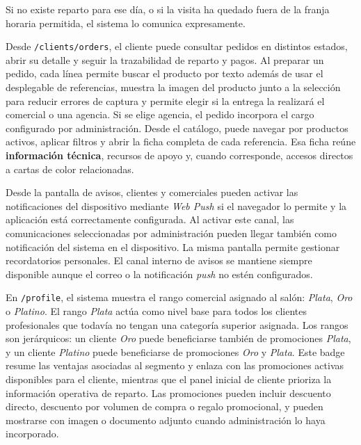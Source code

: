 Si no existe reparto para ese día, o si la visita ha quedado fuera de la franja horaria permitida, el sistema lo comunica expresamente.

Desde \texttt{/clients/orders}, el cliente puede consultar pedidos en distintos estados, abrir su detalle y seguir la trazabilidad de reparto y pagos. Al preparar un pedido, cada línea permite buscar el producto por texto además de usar el desplegable de referencias, muestra la imagen del producto junto a la selección para reducir errores de captura y permite elegir si la entrega la realizará el comercial o una agencia. Si se elige agencia, el pedido incorpora el cargo configurado por administración. Desde el catálogo, puede navegar por productos activos, aplicar filtros y abrir la ficha completa de cada referencia. Esa ficha reúne \textbf{información técnica}, recursos de apoyo y, cuando corresponde, accesos directos a cartas de color relacionadas.

Desde la pantalla de avisos, clientes y comerciales pueden activar las notificaciones del dispositivo mediante \textit{Web Push} si el navegador lo permite y la aplicación está correctamente configurada. Al activar este canal, las comunicaciones seleccionadas por administración pueden llegar también como notificación del sistema en el dispositivo. La misma pantalla permite gestionar recordatorios personales. El canal interno de avisos se mantiene siempre disponible aunque el correo o la notificación \textit{push} no estén configurados.

En \texttt{/profile}, el sistema muestra el rango comercial asignado al salón: \textit{Plata}, \textit{Oro} o \textit{Platino}. El rango \textit{Plata} actúa como nivel base para todos los clientes profesionales que todavía no tengan una categoría superior asignada. Los rangos son jerárquicos: un cliente \textit{Oro} puede beneficiarse también de promociones \textit{Plata}, y un cliente \textit{Platino} puede beneficiarse de promociones \textit{Oro} y \textit{Plata}. Este badge resume las ventajas asociadas al segmento y enlaza con las promociones activas disponibles para el cliente, mientras que el panel inicial de cliente prioriza la información operativa de reparto. Las promociones pueden incluir descuento directo, descuento por volumen de compra o regalo promocional, y pueden mostrarse con imagen o documento adjunto cuando administración lo haya incorporado.

